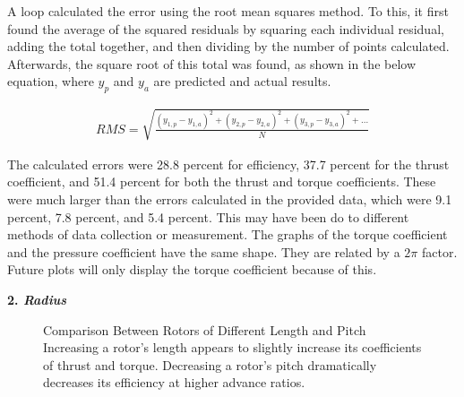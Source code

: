 \documentclass{article}
\begin{document}
A loop calculated the error using the root mean squares method. To this, it first found the average of the squared residuals by squaring each individual residual, adding the total together, and then dividing by the number of points calculated. Afterwards, the square root of this total was found, as shown in the below equation, where $y_{p}$ and $y_{a}$ are predicted and actual results. \newline

\begin{equation}
\begin{aligned}
	RMS = \sqrt{\frac{(y_{1,p}-y_{1,a})^{2} + (y_{2,p}-y_{2,a})^{2} + (y_{3,p}-y_{3,a})^{2} + ...}{N}}
\end{aligned}
\end{equation}

 The calculated errors were 28.8 percent for efficiency, 37.7 percent for the thrust coefficient, and 51.4 percent for both the thrust and torque coefficients. These were much larger than the errors calculated in the provided data, which were 9.1 percent, 7.8 percent, and 5.4 percent. This may have been do to different methods of data collection or measurement. The graphs of the torque coefficient and the pressure coefficient have the same shape. They are related by a $2 \pi$ factor. Future plots will only display the torque coefficient because of this. \newline

\textbf{2. \emph{Radius}} \newline

\begin{figure}
  \centering
  \caption{Comparison Between Rotors of Different Length and Pitch \newline Increasing a rotor's length appears to slightly increase its coefficients of thrust and torque. Decreasing a rotor's pitch dramatically decreases its efficiency at higher advance ratios.}
  \label{fig:3}
\end{figure}
\end{document}
